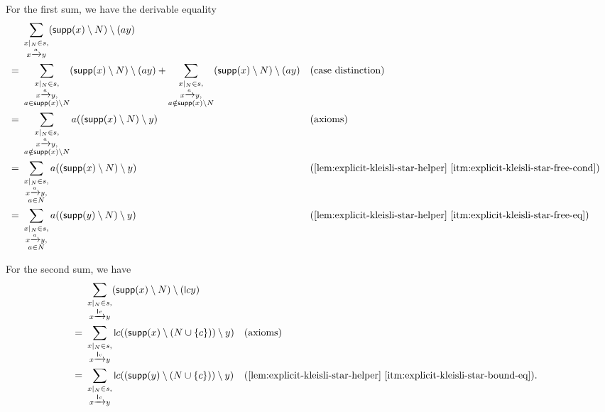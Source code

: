 \documentclass[11pt,a4paper]{amsart}
\newcommand{\supp}{\mathsf{supp}}
\theoremstyle{plain}
\newcommand{\midmid}{\hspace{0.2ex}{\rule[-0.1ex]{0.6pt}{1.65ex}}\hspace{0.2ex}}
\newcommand{\scriptmidmid}{\hspace{0.2ex}{\rule[-0.1ex]{0.6pt}{1.1ex}}\hspace{0.2ex}}
\newcommand{\newletter}[1]{{\midmid}#1}
\newcommand{\scriptnew}[1]{{\scriptmidmid}#1}
\numberwithin{equation}{section}
\newcommand{\+}[1]{\mathcal{#1}\xspace}
\theoremstyle{definition}
\begin{document}
For the first sum, we have the derivable equality
\begin{align*}
  &\sum\limits_{\substack{x|_N \in s, \\ x \xrightarrow{a} y}} (\supp(x) \setminus N) \setminus (ay) \\
  =~&\sum\limits_{\substack{x|_N \in s, \\ x \xrightarrow{a} y, \\ a \in \supp(x) \setminus N}} (\supp(x) \setminus N) \setminus (ay) + \sum\limits_{\substack{x|_N \in s, \\ x \xrightarrow{a} y, \\ a \notin \supp(x) \setminus N}} (\supp(x) \setminus N) \setminus (ay) && \text{(case distinction)} \\
  =~&\sum\limits_{\substack{x|_N \in s, \\ x \xrightarrow{a} y, \\ a \notin \supp(x) \setminus N}} a((\supp(x) \setminus N) \setminus y) && \text{(axioms)} \\
  =~&\sum\limits_{\substack{x|_N \in s, \\ x \xrightarrow{a} y, \\ a \in N}} a((\supp(x) \setminus N) \setminus y) && \text{(\cref{lem:explicit-kleisli-star-helper} \eqref{itm:explicit-kleisli-star-free-cond})} \\
  =~&\sum\limits_{\substack{x|_N \in s, \\ x \xrightarrow{a} y, \\ a \in N}} a((\supp(y) \setminus N) \setminus y) && \text{(\cref{lem:explicit-kleisli-star-helper} \eqref{itm:explicit-kleisli-star-free-eq})} \\
\end{align*}

For the second sum, we have
\begin{align*}
  &\sum\limits_{\substack{x|_N \in s, \\ x \xrightarrow{\scriptnew{c}} y}} (\supp(x) \setminus N) \setminus (\newletter{c}y) \\
  =~&\sum\limits_{\substack{x|_N \in s, \\ x \xrightarrow{\scriptnew{c}} y}} \newletter{c}((\supp(x) \setminus (N \cup \{c\})) \setminus y) && \text{(axioms)} \\
  =~&\sum\limits_{\substack{x|_N \in s, \\ x \xrightarrow{\scriptnew{c}} y}} \newletter{c}((\supp(y) \setminus (N \cup \{c\})) \setminus y) && \text{(\cref{lem:explicit-kleisli-star-helper} \eqref{itm:explicit-kleisli-star-bound-eq})}.
\end{align*}
\end{document}
